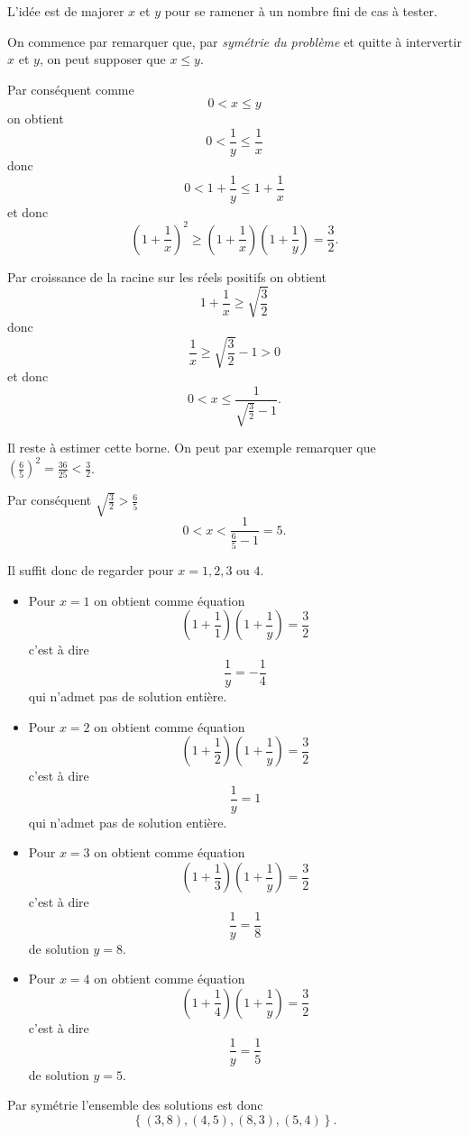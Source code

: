 \begin{sol}
	L'idée est de majorer $x$ et $y$ pour se ramener à un nombre fini de cas à tester.

	On commence par remarquer que, par \emph{symétrie du problème} et quitte à intervertir $x$ et $y$, on peut supposer que $x \leq y$.

	Par conséquent comme
	\[0 < x \leq y\]
	on obtient
	\[0 < \frac{1}{y} \leq \frac{1}{x}\]
	donc
	\[0 < 1+\frac{1}{y} \leq 1+\frac{1}{x}\]
	et donc
	\[\left(1 + \frac{1}{x} \right)^2 \geq \left( 1 + \frac{1}{x}\right) \left(1 + \frac{1}{y} \right) = \frac{3}{2}.\]

	Par croissance de la racine sur les réels positifs on obtient
	\[1 + \frac{1}{x} \geq \sqrt{\frac{3}{2}}\]
	donc
	\[\frac{1}{x} \geq \sqrt{\frac{3}{2}}-1 > 0\]
	et donc
	\[0 < x \leq \frac{1}{\sqrt{\frac{3}{2}}-1}.\]


	Il reste à estimer cette borne. On peut par exemple remarquer que $\left( \frac{6}{5}\right)^2 = \frac{36}{25} < \frac{3}{2}$.

	Par conséquent $\sqrt{\frac{3}{2}} > \frac{6}{5}$
	\[0 < x < \frac{1}{\frac{6}{5}-1} = 5.\]

	Il suffit donc de regarder pour $x =1, 2, 3 \text{ ou } 4$.

	\begin{itemize}
		\item Pour $x=1$ on obtient comme équation
		\[\left(1 + \frac{1}{1} \right)\left(1 + \frac{1}{y} \right) = \frac{3}{2}\]
		c'est à dire
		\[\frac{1}{y} = -\frac{1}{4}\]
		qui n'admet pas de solution entière.
		\item Pour $x=2$ on obtient comme équation
		\[\left(1 + \frac{1}{2} \right)\left(1 + \frac{1}{y} \right) = \frac{3}{2}\]
		c'est à dire
		\[\frac{1}{y} = 1\]
		qui n'admet pas de solution entière.
		\item Pour $x=3$ on obtient comme équation
		\[\left(1 + \frac{1}{3} \right)\left(1 + \frac{1}{y} \right) = \frac{3}{2}\]
		c'est à dire
		\[\frac{1}{y} = \frac{1}{8}\]
		de solution $y=8$.
		\item Pour $x=4$ on obtient comme équation
		\[\left(1 + \frac{1}{4} \right)\left(1 + \frac{1}{y} \right) = \frac{3}{2}\]
		c'est à dire
		\[\frac{1}{y} = \frac{1}{5}\]
		de solution $y=5$.
	\end{itemize}

	Par symétrie l'ensemble des solutions est donc
	\[\boxed{\left\lbrace (3,8), (4,5), (8,3), (5,4) \right\rbrace}.\]
\end{sol}


